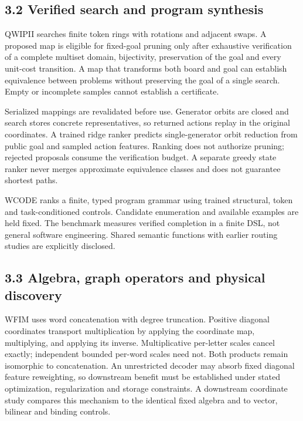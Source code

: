 \documentclass[
  11pt,
  a4paper,
]{article}
\begin{document}
\subsection{3.2 Verified search and program
synthesis}\label{verified-search-and-program-synthesis}

QWIPII searches finite token rings with rotations and adjacent swaps. A
proposed map is eligible for fixed-goal pruning only after exhaustive
verification of a complete multiset domain, bijectivity, preservation of
the goal and every unit-cost transition. A map that transforms both
board and goal can establish equivalence between problems without
preserving the goal of a single search. Empty or incomplete samples
cannot establish a certificate.

Serialized mappings are revalidated before use. Generator orbits are
closed and search stores concrete representatives, so returned actions
replay in the original coordinates. A trained ridge ranker predicts
single-generator orbit reduction from public goal and sampled action
features. Ranking does not authorize pruning; rejected proposals consume
the verification budget. A separate greedy state ranker never merges
approximate equivalence classes and does not guarantee shortest paths.

WCODE ranks a finite, typed program grammar using trained structural,
token and task-conditioned controls. Candidate enumeration and available
examples are held fixed. The benchmark measures verified completion in a
finite DSL, not general software engineering. Shared semantic functions
with earlier routing studies are explicitly disclosed.

\subsection{3.3 Algebra, graph operators and physical
discovery}\label{algebra-graph-operators-and-physical-discovery}

WFIM uses word concatenation with degree truncation. Positive diagonal
coordinates transport multiplication by applying the coordinate map,
multiplying, and applying its inverse. Multiplicative per-letter scales
cancel exactly; independent bounded per-word scales need not. Both
products remain isomorphic to concatenation. An unrestricted decoder may
absorb fixed diagonal feature reweighting, so downstream benefit must be
established under stated optimization, regularization and storage
constraints. A downstream coordinate study compares this mechanism to
the identical fixed algebra and to vector, bilinear and binding
controls.
\end{document}

